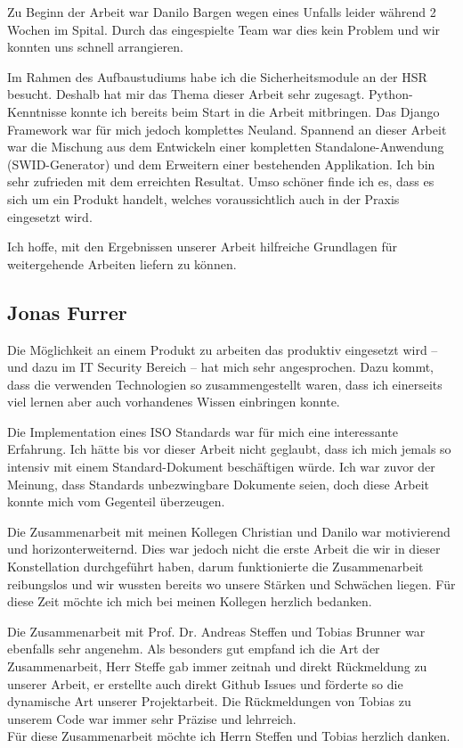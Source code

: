 Zu Beginn der Arbeit war Danilo Bargen wegen eines Unfalls leider während 2
Wochen im Spital. Durch das eingespielte Team war dies kein Problem und wir
konnten uns schnell arrangieren.

Im Rahmen des Aufbaustudiums habe ich die Sicherheitsmodule an der HSR besucht.
Deshalb hat mir das Thema dieser Arbeit sehr zugesagt. Python-Kenntnisse konnte
ich bereits beim Start in die Arbeit mitbringen. Das Django Framework war für
mich jedoch komplettes Neuland. Spannend an dieser Arbeit war die Mischung aus
dem Entwickeln einer kompletten Standalone-Anwendung (SWID-Generator) und dem
Erweitern einer bestehenden Applikation. Ich bin sehr zufrieden mit dem
erreichten Resultat. Umso schöner finde ich es, dass es sich um ein Produkt
handelt, welches voraussichtlich auch in der Praxis eingesetzt wird.

Ich hoffe, mit den Ergebnissen unserer Arbeit hilfreiche Grundlagen für
weitergehende Arbeiten liefern zu können.


\subsection{Jonas Furrer} 
Die Möglichkeit an einem Produkt zu arbeiten das produktiv eingesetzt wird --
und dazu im IT Security Bereich -- hat mich sehr angesprochen. Dazu kommt, dass
die verwenden Technologien so zusammengestellt waren, dass ich einerseits viel
lernen aber auch vorhandenes Wissen einbringen konnte.

Die Implementation eines ISO Standards war für mich eine interessante Erfahrung.
Ich hätte bis vor dieser Arbeit nicht geglaubt, dass ich mich jemals so intensiv
mit einem Standard-Dokument beschäftigen würde. Ich war zuvor der Meinung, dass
Standards unbezwingbare Dokumente seien, doch diese Arbeit konnte mich vom
Gegenteil überzeugen.

Die Zusammenarbeit mit meinen Kollegen Christian und Danilo war motivierend und
horizonterweiternd. Dies war jedoch nicht die erste Arbeit die wir in dieser
Konstellation durchgeführt haben, darum funktionierte die Zusammenarbeit
reibungslos und wir wussten bereits wo unsere Stärken und Schwächen liegen. Für
diese Zeit möchte ich mich bei meinen Kollegen herzlich bedanken.

Die Zusammenarbeit mit Prof. Dr. Andreas Steffen und Tobias Brunner war
ebenfalls sehr angenehm. Als besonders gut empfand ich die Art der
Zusammenarbeit, Herr Steffe gab immer zeitnah und direkt Rückmeldung zu unserer
Arbeit, er erstellte auch direkt Github Issues und förderte so die dynamische
Art unserer Projektarbeit. Die Rückmeldungen von Tobias zu unserem Code war
immer sehr Präzise und lehrreich. \\ Für diese Zusammenarbeit möchte ich Herrn
Steffen und Tobias herzlich danken.